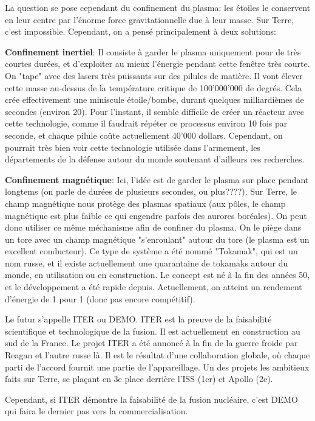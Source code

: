 \documentclass{article}
\begin{document}
La question se pose cependant du confinement du plasma: les étoiles le conservent en leur centre par l'énorme force gravitationnelle due à leur masse. Sur Terre, c'est impossible. Cependant, on a pensé principalement à deux solutions: \par
\textbf{Confinement inertiel}:  Il consiste à garder le plasma uniquement pour de très courtes durées, et d'exploiter au mieux l'énergie pendant cette fenêtre très courte. On "tape" avec des lasers très puissants sur des pilules de matière. Il vont élever cette masse au-dessus de la température critique de 100'000'000 de degrés. Cela crée effectivement une miniscule étoile/bombe, durant quelques milliardièmes de secondes (environ 20). Pour l'instant, il semble difficile de créer un réacteur avec cette technologie, comme il faudrait répéter ce processus environ 10 fois par seconde, et chaque pilule coûte actuellement 40'000 dollars. Cependant, on pourrait très bien voir cette technologie utilisée dans l'armement, les départements de la défense autour du monde soutenant d'ailleurs ces recherches. \par
\textbf{Confinement magnétique}: Ici, l'idée est de garder le plasma sur place pendant longtems (on parle de durées de plusieurs secondes, ou plus????). Sur Terre, le champ magnétique nous protège des plasmas spatiaux (aux pôles, le champ magnétique est plus faible ce qui engendre parfois des aurores boréales). On peut donc utiliser ce même méchanisme afin de confiner du plasma. On le piège dans un tore avec un champ magnétique "s'enroulant" autour du tore (le plasma est un excellent conducteur). Ce type de système a été nommé "Tokamak", qui est un nom russe, et il existe actuellement une quarantaine de tokamaks autour du monde, en utilisation ou en construction. Le concept est né à la fin des années 50, et le développement a été rapide depuis. Actuellement, on atteint un rendement d'énergie de 1 pour 1 (donc pas encore compétitif). \par
 Le futur s'appelle ITER ou DEMO. ITER est la preuve de la faisabilité scientifique et technologique de la fusion. Il est actuellement en construction au sud de la France. Le projet ITER a été annoncé à la fin de la guerre froide par Reagan et l'autre russe là. Il est le résultat d'une collaboration globale, où chaque parti de l'accord fournit une partie de l'appareillage. Un des projets les ambitieux faits sur Terre, se plaçant en 3e place derrière l'ISS (1er) et Apollo (2e). \par
 Cependant, si ITER démontre la faisabilité de la fusion nucléaire, c'est DEMO qui faira le dernier pas vers la commercialisation. \par
\end{document}

